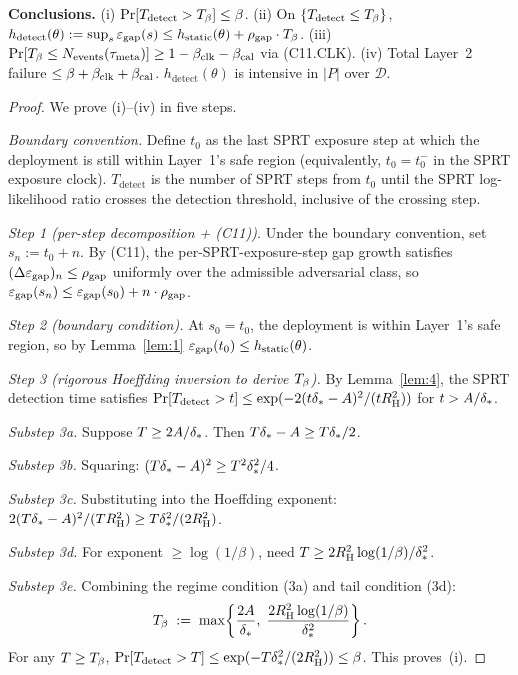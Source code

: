 \textbf{Conclusions.}
(i) $\Pr[T_{\mathrm{detect}} > T_{\beta}] \leq \beta$.
(ii) On $\{T_{\mathrm{detect}} \leq T_{\beta}\}$,
$h_{\mathrm{detect}}(\theta) := \sup_s \varepsilon_{\mathrm{gap}}(s) \leq
h_{\mathrm{static}}(\theta) + \rho_{\mathrm{gap}} \cdot T_{\beta}$.
(iii) $\Pr[T_{\beta} \leq N_{\mathrm{events}}(\tau_{\mathrm{meta}})] \geq 1 - \beta_{\mathrm{clk}}
- \beta_{\mathrm{cal}}$ via (C11.CLK).
(iv) Total Layer~2 failure $\leq \beta + \beta_{\mathrm{clk}} + \beta_{\mathrm{cal}}$.
$h_{\mathrm{detect}}(\theta)$ is intensive in $|P|$ over
$\mathcal{D}$.

\begin{proof}
We prove (i)--(iv) in five steps.

\emph{Boundary convention.}  Define $t_0$ as the last SPRT
exposure step at which the deployment is still within Layer~1's
safe region (equivalently, $t_0 = t_0^-$ in the SPRT exposure
clock).  $T_{\mathrm{detect}}$ is the number of SPRT steps from
$t_0$ until the SPRT log-likelihood ratio crosses the detection
threshold, inclusive of the crossing step.

\emph{Step 1 (per-step decomposition + (C11)).}  Under the
boundary convention, set $s_n := t_0 + n$.  By (C11), the
per-SPRT-exposure-step gap growth satisfies
$(\Delta\varepsilon_{\mathrm{gap}})_n \leq \rho_{\mathrm{gap}}$ uniformly over the admissible
adversarial class, so
$\varepsilon_{\mathrm{gap}}(s_n) \leq \varepsilon_{\mathrm{gap}}(s_0) + n \cdot \rho_{\mathrm{gap}}$.

\emph{Step 2 (boundary condition).}  At $s_0 = t_0$, the
deployment is within Layer~1's safe region, so by Lemma~\ref{lem:1}
$\varepsilon_{\mathrm{gap}}(t_0) \leq h_{\mathrm{static}}(\theta)$.

\emph{Step 3 (rigorous Hoeffding inversion to derive $T_{\beta}$).}
By Lemma~\ref{lem:4}, the SPRT detection time satisfies
$\Pr[T_{\mathrm{detect}} > t] \leq \exp(-2(t\delta_{*} -
A)^2/(tR_{\mathrm{H}}^2))$ for $t > A/\delta_{*}$.

\emph{Substep 3a.}  Suppose $T \geq 2A/\delta_{*}$.  Then
$T\delta_{*} - A \geq T\delta_{*}/2$.

\emph{Substep 3b.}  Squaring: $(T\delta_{*} - A)^2 \geq
T^2\delta_{*}^2/4$.

\emph{Substep 3c.}  Substituting into the Hoeffding exponent:
$2(T\delta_{*} - A)^2/(TR_{\mathrm{H}}^2) \geq T\delta_{*}^2/(2R_{\mathrm{H}}^2)$.

\emph{Substep 3d.}  For exponent $\geq \log(1/\beta)$, need
$T \geq 2R_{\mathrm{H}}^2\log(1/\beta)/\delta_{*}^2$.

\emph{Substep 3e.}  Combining the regime condition (3a) and tail
condition (3d):
\[
  T_{\beta} \;:=\; \max\!\left\{\frac{2A}{\delta_{*}},\;
  \frac{2R_{\mathrm{H}}^2\log(1/\beta)}{\delta_{*}^2}\right\}.
\]
For any $T \geq T_{\beta}$, $\Pr[T_{\mathrm{detect}} > T] \leq
\exp(-T\delta_{*}^2/(2R_{\mathrm{H}}^2)) \leq \beta$.  This proves~(i).


\end{proof}
